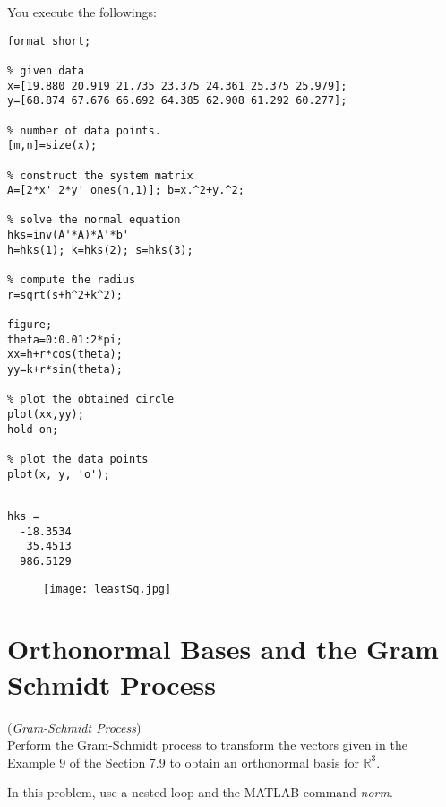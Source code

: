 \begin{sol}
You execute the followings:
\begin{verbatim}
format short;

% given data
x=[19.880 20.919 21.735 23.375 24.361 25.375 25.979]; 
y=[68.874 67.676 66.692 64.385 62.908 61.292 60.277];

% number of data points.
[m,n]=size(x);

% construct the system matrix
A=[2*x' 2*y' ones(n,1)]; b=x.^2+y.^2;

% solve the normal equation
hks=inv(A'*A)*A'*b'
h=hks(1); k=hks(2); s=hks(3);

% compute the radius
r=sqrt(s+h^2+k^2);

figure; 
theta=0:0.01:2*pi; 
xx=h+r*cos(theta); 
yy=k+r*sin(theta);

% plot the obtained circle
plot(xx,yy); 
hold on; 

% plot the data points
plot(x, y, 'o');
\end{verbatim}



\begin{outputs}
\begin{verbatim}

hks =
  -18.3534
   35.4513
  986.5129
\end{verbatim}
\begin{figure}[h]
\centering
\texttt{[image: leastSq.jpg]}
\end{figure}

\end{outputs}

\end{sol}








\section{Orthonormal Bases and the Gram Schmidt Process}

\begin{exer} (\textit{Gram-Schmidt Process})\\
Perform the Gram-Schmidt process to transform the vectors given in the Example 9 of the Section 7.9 to obtain an orthonormal basis for $\mathbb{R}^{3}$.

In this problem, use a nested loop and the MATLAB command \textit{norm}.
\end{exer}

